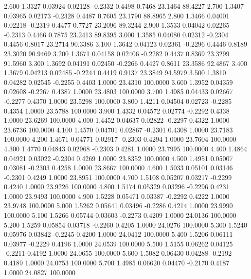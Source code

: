    2.600   1.3327   0.03924   0.02128  -0.2332   0.4498   0.7468  23.1464  88.4227
   2.700   1.3407   0.03965   0.02173  -0.2328   0.4487   0.7605  23.1790  88.8965
   2.800   1.3466   0.04001   0.02218  -0.2319   0.4477   0.7727  23.2096  89.3244
   2.900   1.3533   0.04042   0.02265  -0.2313   0.4466   0.7875  23.2413  89.8395
   3.000   1.3585   0.04080   0.02312  -0.2304   0.4456   0.8017  23.2714  90.3386
   3.100   1.3642   0.04123   0.02361  -0.2296   0.4446   0.8189  23.3020  90.9469
   3.200   1.3671   0.04158   0.02406  -0.2282   0.4437   0.8369  23.3299  91.5960
   3.300   1.3692   0.04191   0.02450  -0.2266   0.4427   0.8611  23.3586  92.4867
   3.400   1.3679   0.04213   0.02485  -0.2244   0.4419   0.9137  23.3849  94.5979
   3.500   1.3810   0.04282   0.02545  -0.2255   0.4403   1.0000  23.4310 100.0000
   3.600   1.3952   0.04359   0.02608  -0.2267   0.4387   1.0000  23.4803 100.0000
   3.700   1.4085   0.04433   0.02667  -0.2277   0.4370   1.0000  23.5298 100.0000
   3.800   1.4211   0.04504   0.02723  -0.2285   0.4354   1.0000  23.5788 100.0000
   3.900   1.4332   0.04572   0.02774  -0.2292   0.4338   1.0000  23.6269 100.0000
   4.000   1.4452   0.04637   0.02822  -0.2297   0.4322   1.0000  23.6736 100.0000
   4.100   1.4570   0.04701   0.02867  -0.2301   0.4308   1.0000  23.7183 100.0000
   4.200   1.4671   0.04771   0.02917  -0.2303   0.4294   1.0000  23.7604 100.0000
   4.300   1.4770   0.04843   0.02968  -0.2303   0.4281   1.0000  23.7995 100.0000
   4.400   1.4864   0.04921   0.03022  -0.2304   0.4269   1.0000  23.8352 100.0000
   4.500   1.4951   0.05007   0.03081  -0.2303   0.4258   1.0000  23.8667 100.0000
   4.600   1.5033   0.05101   0.03146  -0.2301   0.4249   1.0000  23.8951 100.0000
   4.700   1.5108   0.05207   0.03217  -0.2299   0.4240   1.0000  23.9226 100.0000
   4.800   1.5174   0.05329   0.03296  -0.2296   0.4231   1.0000  23.9493 100.0000
   4.900   1.5228   0.05471   0.03387  -0.2292   0.4222   1.0000  23.9748 100.0000
   5.000   1.5262   0.05641   0.03496  -0.2286   0.4214   1.0000  23.9990 100.0000
   5.100   1.5266   0.05744   0.03603  -0.2273   0.4209   1.0000  24.0136 100.0000
   5.200   1.5259   0.05854   0.03718  -0.2260   0.4205   1.0000  24.0276 100.0000
   5.300   1.5240   0.05976   0.03842  -0.2245   0.4200   1.0000  24.0412 100.0000
   5.400   1.5206   0.06111   0.03977  -0.2229   0.4196   1.0000  24.0539 100.0000
   5.500   1.5155   0.06262   0.04125  -0.2211   0.4192   1.0000  24.0655 100.0000
   5.600   1.5082   0.06430   0.04288  -0.2192   0.4189   1.0000  24.0753 100.0000
   5.700   1.4985   0.06620   0.04470  -0.2170   0.4187   1.0000  24.0827 100.0000
